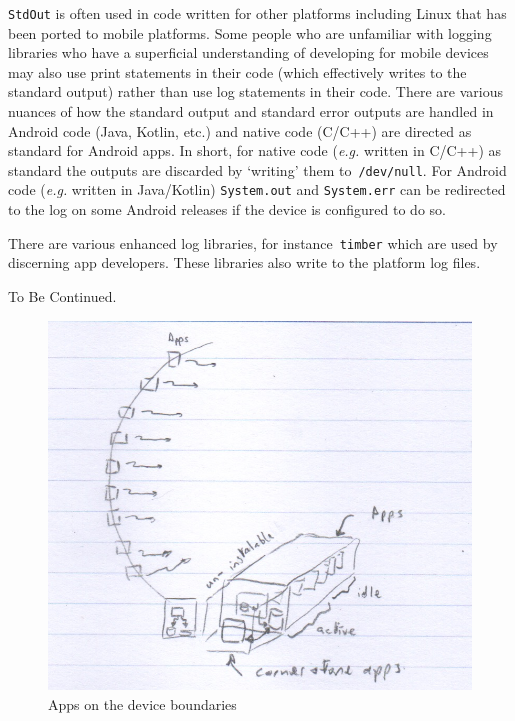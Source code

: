 \texttt{StdOut} is often used in code written for other platforms including Linux that has been ported to mobile platforms. Some people who are unfamiliar with logging libraries who have a superficial understanding of developing for mobile devices may also use print statements in their code (which effectively writes to the standard output) rather than use log statements in their code. There are various nuances of how the standard output and standard error outputs are handled in Android code (Java, Kotlin, etc.) and native code (C/C++) are directed as standard for Android apps. In short, for native code (\emph{e.g.} written in C/C++) as standard the outputs are discarded by `writing' them to~\texttt{/dev/null}. For Android code (\emph{e.g.} written in Java/Kotlin) \texttt{System.out} and \texttt{System.err} can be redirected to the log on some Android releases if the device is configured to do so.

There are various enhanced log libraries, for instance~\texttt{timber} which are used by discerning app developers. These libraries also write to the platform log files. 

To Be Continued. %

\begin{figure}
    \centering
    \includegraphics[width=12cm]{images/rough-sketches/apps-on-device-boundaries-sketch.jpeg}
    \caption{Apps on the device boundaries}
    \label{fig:apps-on-device-boundaries}
\end{figure}


